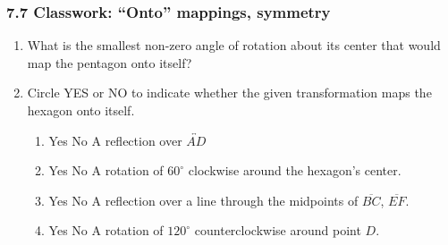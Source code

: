 

\fancyhead[LE]{\thepage}



\subsubsection*{7.7 Classwork: ``Onto'' mappings, symmetry}
\begin{enumerate}
\item What is the smallest non-zero angle of rotation about its center that would map the pentagon onto itself? %
\begin{center}
  \end{center}

\item Circle YES or NO to indicate whether the given transformation maps the hexagon onto itself.
\vspace{0.5cm}
\begin{multicols}{2}
 \begin{enumerate}
  \item Yes \quad No \quad A reflection over $\overleftrightarrow{AD}$
  \item Yes \quad No \quad A rotation of $60^\circ$ clockwise around the hexagon's center.
  \item Yes \quad No \quad A reflection over a line through the midpoints of  $\overline{BC}$, $\overline{EF}$.
  \item Yes \quad No \quad A rotation of $120^\circ$ counterclockwise around point $D$.
  \end{enumerate}
\begin{center}
  \end{center}
\end{multicols} \vspace{0.5cm}


\end{enumerate}
